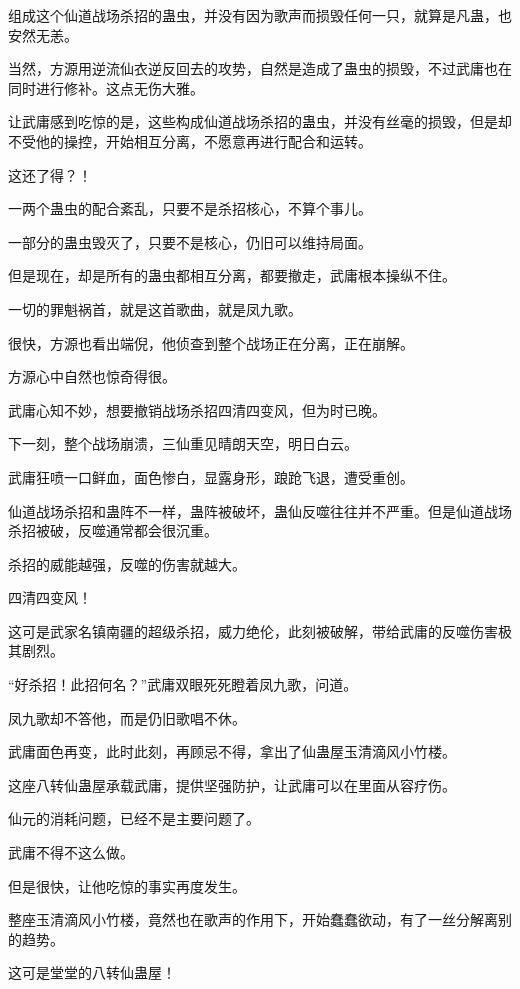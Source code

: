 \begin{this_body}
组成这个仙道战场杀招的蛊虫，并没有因为歌声而损毁任何一只，就算是凡蛊，也安然无恙。

当然，方源用逆流仙衣逆反回去的攻势，自然是造成了蛊虫的损毁，不过武庸也在同时进行修补。这点无伤大雅。

让武庸感到吃惊的是，这些构成仙道战场杀招的蛊虫，并没有丝毫的损毁，但是却不受他的操控，开始相互分离，不愿意再进行配合和运转。

这还了得？！

一两个蛊虫的配合紊乱，只要不是杀招核心，不算个事儿。

一部分的蛊虫毁灭了，只要不是核心，仍旧可以维持局面。

但是现在，却是所有的蛊虫都相互分离，都要撤走，武庸根本操纵不住。

一切的罪魁祸首，就是这首歌曲，就是凤九歌。

很快，方源也看出端倪，他侦查到整个战场正在分离，正在崩解。

方源心中自然也惊奇得很。

武庸心知不妙，想要撤销战场杀招四清四变风，但为时已晚。

下一刻，整个战场崩溃，三仙重见晴朗天空，明日白云。

武庸狂喷一口鲜血，面色惨白，显露身形，踉跄飞退，遭受重创。

仙道战场杀招和蛊阵不一样，蛊阵被破坏，蛊仙反噬往往并不严重。但是仙道战场杀招被破，反噬通常都会很沉重。

杀招的威能越强，反噬的伤害就越大。

四清四变风！

这可是武家名镇南疆的超级杀招，威力绝伦，此刻被破解，带给武庸的反噬伤害极其剧烈。

“好杀招！此招何名？”武庸双眼死死瞪着凤九歌，问道。

凤九歌却不答他，而是仍旧歌唱不休。

武庸面色再变，此时此刻，再顾忌不得，拿出了仙蛊屋玉清滴风小竹楼。

这座八转仙蛊屋承载武庸，提供坚强防护，让武庸可以在里面从容疗伤。

仙元的消耗问题，已经不是主要问题了。

武庸不得不这么做。

但是很快，让他吃惊的事实再度发生。

整座玉清滴风小竹楼，竟然也在歌声的作用下，开始蠢蠢欲动，有了一丝分解离别的趋势。

这可是堂堂的八转仙蛊屋！


\end{this_body}
